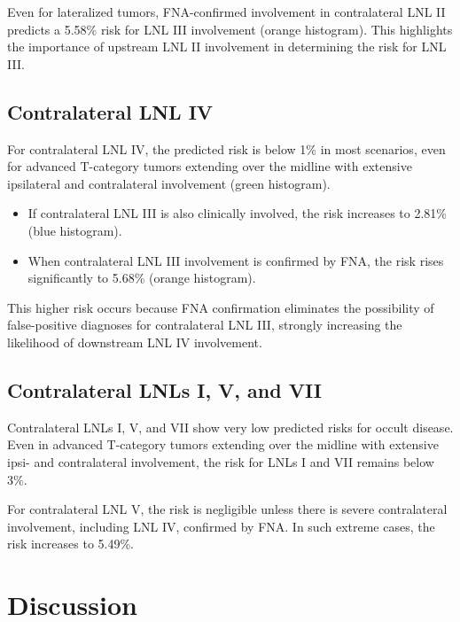 \documentclass[
  sn-mathphys-num,
]{sn-jnl}
\providecommand{\tightlist}{%
  \setlength{\itemsep}{0pt}\setlength{\parskip}{0pt}}\usepackage{longtable,booktabs,array}
\begin{document}
Even for lateralized tumors, FNA-confirmed involvement in contralateral
LNL II predicts a 5.58\% risk for LNL III involvement (orange
histogram). This highlights the importance of upstream LNL II
involvement in determining the risk for LNL III.

\subsection{Contralateral LNL IV}\label{contralateral-lnl-iv}

For contralateral LNL IV, the predicted risk is below 1\% in most
scenarios, even for advanced T-category tumors extending over the
midline with extensive ipsilateral and contralateral involvement (green
histogram).

\begin{itemize}
\tightlist
\item
  If contralateral LNL III is also clinically involved, the risk
  increases to 2.81\% (blue histogram).\\
\item
  When contralateral LNL III involvement is confirmed by FNA, the risk
  rises significantly to 5.68\% (orange histogram).
\end{itemize}

This higher risk occurs because FNA confirmation eliminates the
possibility of false-positive diagnoses for contralateral LNL III,
strongly increasing the likelihood of downstream LNL IV involvement.

\subsection{Contralateral LNLs I, V, and
VII}\label{contralateral-lnls-i-v-and-vii}

Contralateral LNLs I, V, and VII show very low predicted risks for
occult disease. Even in advanced T-category tumors extending over the
midline with extensive ipsi- and contralateral involvement, the risk for
LNLs I and VII remains below 3\%.

For contralateral LNL V, the risk is negligible unless there is severe
contralateral involvement, including LNL IV, confirmed by FNA. In such
extreme cases, the risk increases to 5.49\%.

\section{Discussion}\label{sec-discussion}
\end{document}

